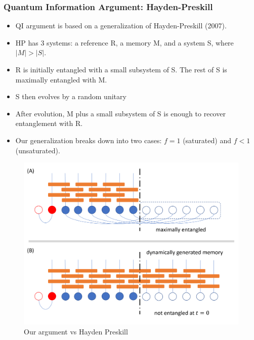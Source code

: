 \documentclass[10pt,aspectratio=169]{beamer}
\begin{document}

\begin{frame}
\frametitle{Quantum Information Argument: Hayden-Preskill}

\begin{minipage}[t]{0.44\linewidth}

\begin{itemize}

\item QI argument is based on a generalization of Hayden-Preskill (2007).

\item HP has 3 systems: a reference R, a memory M, and a system S, where $|M| > |S|$.

\item R is initially entangled with a small subsystem of S. The rest of S is maximally entangled with M.

\item S then evolves by a random unitary

\item After evolution, M plus a small subsystem of S is enough to recover entanglement with R.

\item Our generalization breaks down into two cases: $f=1$ (saturated) and $f<1$ (unsaturated). 

\end{itemize}

\end{minipage}\hfill
%
\begin{minipage}[t]{0.55\linewidth}

\begin{figure}
    \begin{center}
    
        \includegraphics[scale=0.25]{hp_explain}    
    
    \end{center}
    \caption{Our argument vs Hayden Preskill}
    \label{fig:HPExplained}
\end{figure}

\end{minipage}

\end{frame}
\end{document}
